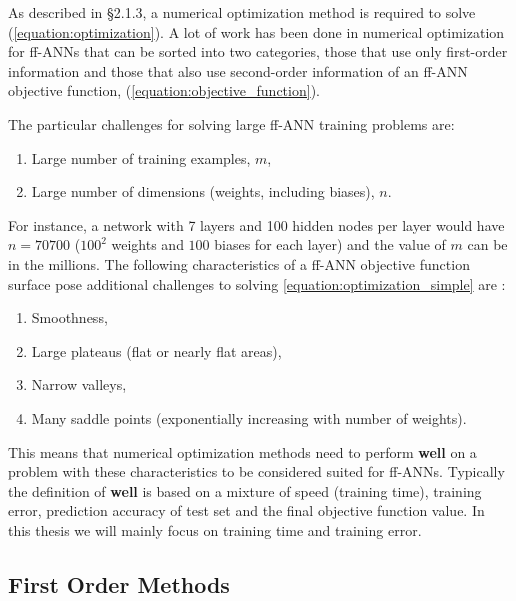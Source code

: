 \documentclass[letterpaper,12pt,titlepage,oneside,final]{book}
\begin{document}
	As described in \S{2.1.3}, a numerical optimization method is required to solve (\ref{equation:optimization}). A lot of work has been done in numerical optimization for ff-ANNs that can be sorted into two categories, those that use only first-order information and those that also use second-order information of an ff-ANN objective function, (\ref{equation:objective_function}). 
	
	The particular challenges for solving large ff-ANN training problems are:
	\begin{enumerate}
		\item {Large number of training examples, $m$,}
		\item {Large number of dimensions (weights, including biases), $n$. }
	\end{enumerate}
	For instance, a network with 7 layers and 100 hidden nodes per layer would have $n=70700$ ($100^{2}$ weights and $100$ biases for each layer) and the value of $m$ can be in the millions. The following characteristics of a ff-ANN objective function surface pose additional challenges to solving \ref{equation:optimization_simple} are \cite{Shepherd.1997}:
	\begin{enumerate}
		\item {Smoothness,}
		\item {Large plateaus (flat or nearly flat areas),}
		\item {Narrow valleys,}
		\item {Many saddle points (exponentially increasing with number of weights).}
	\end{enumerate}
	This means that numerical optimization methods need to perform \textbf{well} on a problem with these characteristics to be considered suited for ff-ANNs. Typically the definition of \textbf{well} is based on a mixture of speed (training time), training error, prediction accuracy of test set and the final objective function value. In this thesis we will mainly focus on training time and training error.
	
	\subsection{First Order Methods}
	
\end{document}
